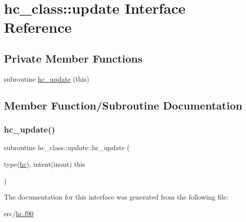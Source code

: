 \hypertarget{interfacehc__class_1_1update}{}\section{hc\+\_\+class\+:\+:update Interface Reference}
\label{interfacehc__class_1_1update}
\subsection*{Private Member Functions}
\begin{DoxyCompactItemize}
\item 
subroutine \hyperlink{interfacehc__class_1_1update_ae7287048ca710a2ee85c861edbbe6312}{hc\+\_\+update} (this)
\end{DoxyCompactItemize}


\subsection{Member Function/\+Subroutine Documentation}
\mbox{\label{interfacehc__class_1_1update_ae7287048ca710a2ee85c861edbbe6312}} 
\subsubsection{\texorpdfstring{hc\+\_\+update()}{hc\_update()}}
{\footnotesize\ttfamily subroutine hc\+\_\+class\+::update\+::hc\+\_\+update (\begin{DoxyParamCaption}\item[{type(\hyperlink{structhc__class_1_1hc}{hc}), intent(inout)}]{this }\end{DoxyParamCaption})\hspace{0.3cm}{\ttfamily [private]}}



The documentation for this interface was generated from the following file\+:\begin{DoxyCompactItemize}
\item 
src/\hyperlink{hc_8f90}{hc.\+f90}\end{DoxyCompactItemize}
